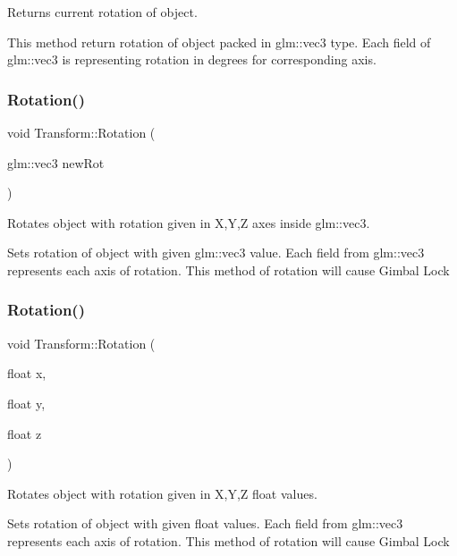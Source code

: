 Returns current rotation of object. 

This method return rotation of object packed in glm\+::vec3 type. Each field of glm\+::vec3 is representing rotation in degrees for corresponding axis. \mbox{\label{class_transform_ae19384ad3a8fc19d997bab8be905eb8a}} 
\subsubsection{\texorpdfstring{Rotation()}{Rotation()}\hspace{0.1cm}{\footnotesize\ttfamily [2/3]}}
{\footnotesize\ttfamily void Transform\+::\+Rotation (\begin{DoxyParamCaption}\item[{glm\+::vec3}]{new\+Rot }\end{DoxyParamCaption})\hspace{0.3cm}{\ttfamily [inline]}}



Rotates object with rotation given in X,Y,Z axes inside glm\+::vec3. 

Sets rotation of object with given glm\+::vec3 value. Each field from glm\+::vec3 represents each axis of rotation. This method of rotation will cause Gimbal Lock \mbox{\label{class_transform_a08eb7ce459e2be8c180741f29990583a}} 
\subsubsection{\texorpdfstring{Rotation()}{Rotation()}\hspace{0.1cm}{\footnotesize\ttfamily [3/3]}}
{\footnotesize\ttfamily void Transform\+::\+Rotation (\begin{DoxyParamCaption}\item[{float}]{x,  }\item[{float}]{y,  }\item[{float}]{z }\end{DoxyParamCaption})\hspace{0.3cm}{\ttfamily [inline]}}



Rotates object with rotation given in X,Y,Z float values. 

Sets rotation of object with given float values. Each field from glm\+::vec3 represents each axis of rotation. This method of rotation will cause Gimbal Lock \mbox{\label{class_transform_a60238a62017be874dea8514a4b172fcc}} 
